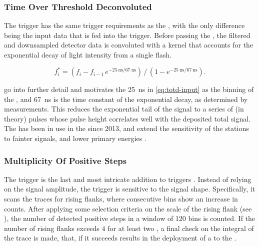 \subsubsection{Time Over Threshold Deconvoluted}

The \ToTd trigger has the same trigger requirements as the \ToT, with the only
difference being the input data that is fed into the trigger. Before passing 
the \ToTd, the filtered and downsampled detector data is convoluted with a 
kernel that accounts for the exponential decay of light intensity from a single
flash.

\begin{equation}
\label{eq:totd-input}
f^*_i = \left( f_i - f_{i-1} \, e^{-\SI{25}{\nano\second}/\SI{67}{\nano\second}} \right)\,/\,\left( 1 - e^{-\SI{25}{\nano\second}/\SI{67}{\nano\second} } \right).
\end{equation}

\cite{billoirPeakSearchingSurface2002, colemanNewTriggerSettings2018} go into 
further detail and motivates the \SI{25}{\nano\second} in \cref{eq:totd-input} 
as the binning of the \UB, and \SI{67}{\nano\second} is the time constant of 
the exponential decay, as determined by measurements. This reduces the 
exponential tail of the \WCD signal to a series of (in theory) \SB pulses whose
pulse height correlates well with the deposited total signal. The \ToTd has 
been in use in the \SD since 2013, and extend the sensitivity of the \SD 
stations to fainter signals, and lower \EAS primary energies 
\cite{billoirFirstResultsToTd2013}.

\subsubsection{Multiplicity Of Positive Steps}

The \MoPS trigger is the last and most intricate addition to \SD \TTWO triggers
\cite{billoirPropositionImproveLocal13}. Instead of relying on the \WCD signal
amplitude, the \MoPS trigger is sensitive to the signal shape. Specifically, it
scans the \LPMT traces for rising flanks, where consecutive bins show an
increase in \ADC counts. After applying some selection criteria on the scale of
the rising flank (see \cite{colemanNewTriggerSettings2018}), the number of 
detected positive steps in a window of 120 bins is counted. If the number of 
rising flanks exceeds $4$ for at least two \LPMTs, a final check on the 
integral of the \FDS trace is made, that, if it succeeds results in the 
deployment of a \TTWO to the \CDAS.

